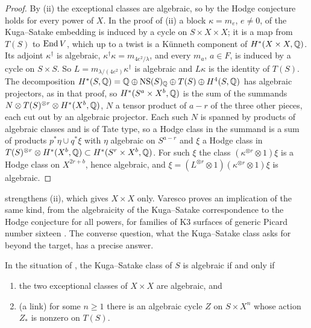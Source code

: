 \begin{proof}
By (ii) the exceptional classes are algebraic, so by
 the Hodge conjecture holds for every power of $X$.
In the proof of (ii) a block $\kappa=m_{e}$, $e\ne0$, of
the Kuga--Satake embedding is induced by a cycle on $S\times X\times X$; it
is a map from $T(S)$ to $\operatorname{End} V$, which up to a twist is a K\"unneth
component of $H^{*}(X\times X,\mathbb{Q})$. Its adjoint $\kappa^{\dagger}$ is
algebraic, $\kappa^{\dagger}\kappa=m_{4e^{2}/\lambda}$, and every $m_{a}$,
$a\in F$, is induced by a cycle on $S\times S$. So
$L=m_{\lambda/(4e^{2})}\kappa^{\dagger}$ is algebraic and $L\kappa$ is the
identity of $T(S)$. The decomposition
$H^{*}(S,\mathbb{Q})=\mathbb{Q}\oplus\mathrm{NS}(S)_{\mathbb{Q}}\oplus T(S)\oplus H^{4}(S,\mathbb{Q})$ has
algebraic projectors, as in that proof, so $H^{*}(S^{a}\times X^{b},\mathbb{Q})$ is
the sum of the summands $N\otimes T(S)^{\otimes r}\otimes H^{*}(X^{b},\mathbb{Q})$,
$N$ a tensor product of $a-r$ of the three other pieces, each cut out by an
algebraic projector. Each such $N$ is spanned by products of algebraic classes
and is of Tate type, so a Hodge class in the summand is a sum of products
$p^{*}\eta\cup q^{*}\xi$ with $\eta$ algebraic on $S^{a-r}$ and $\xi$ a Hodge
class in $T(S)^{\otimes r}\otimes H^{*}(X^{b},\mathbb{Q})\subset H^{*}(S^{r}\times
X^{b},\mathbb{Q})$. For such $\xi$ the class $(\kappa^{\otimes r}\otimes1)\xi$ is a
Hodge class on $X^{2r+b}$, hence algebraic, and
$\xi=(L^{\otimes r}\otimes1)(\kappa^{\otimes r}\otimes1)\xi$ is algebraic.
\end{proof}

 strengthens (ii), which gives
$X\times X$ only. Varesco proves an implication of the same kind, from the
algebraicity of the Kuga--Satake correspondence to the Hodge conjecture for
all powers, for families of K3 surfaces of generic Picard number sixteen
\cite{Var22}. The converse question, what the Kuga--Satake class asks for
beyond the target, has a precise answer.

\begin{proposition}\label{prop:mumfordkslink}
In the situation of , the Kuga--Satake class of
$S$ is algebraic if and only if
\begin{enumerate}[label=\textup{(\roman*)},nosep,leftmargin=2.6em]
\item the two exceptional classes of $X\times X$ are algebraic, and
\item \textup{(}a link\textup{)} for some $n\ge1$ there is an algebraic cycle
  $Z$ on $S\times X^{n}$ whose action $Z_{*}$ is nonzero on $T(S)$.
\end{enumerate}
\end{proposition}

